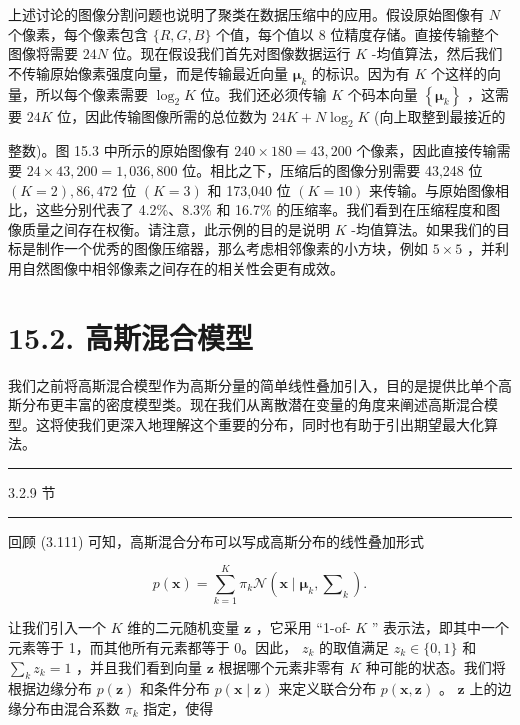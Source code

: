 \documentclass[10pt]{article}
\newcommand{\HRule}{\begin{center}\rule{0.9\linewidth}{0.2mm}\end{center}}
\begin{document}
上述讨论的图像分割问题也说明了聚类在数据压缩中的应用。假设原始图像有 \(N\) 个像素，每个像素包含 \(\{ R,G,B\}\) 个值，每个值以 8 位精度存储。直接传输整个图像将需要 \({24N}\) 位。现在假设我们首先对图像数据运行 \(K\) -均值算法，然后我们不传输原始像素强度向量，而是传输最近向量 \({\mathbf{\mu }}_{k}\) 的标识。因为有 \(K\) 个这样的向量，所以每个像素需要 \({\log }_{2}K\) 位。我们还必须传输 \(K\) 个码本向量 \(\left\{  {\mathbf{\mu }}_{k}\right\}\) ，这需要 \({24K}\) 位，因此传输图像所需的总位数为 \({24K} + N{\log }_{2}K\) (向上取整到最接近的

整数)。图 15.3 中所示的原始图像有 \({240} \times  {180} = {43},{200}\) 个像素，因此直接传输需要 \({24} \times  {43},{200} = 1,{036},{800}\) 位。相比之下，压缩后的图像分别需要 43,248 位 \(\left( {K = 2}\right) ,{86},{472}\) 位 \(\left( {K = 3}\right)\) 和 173,040 位 \(\left( {K = {10}}\right)\) 来传输。与原始图像相比，这些分别代表了 4.2\%、8.3\% 和 16.7\% 的压缩率。我们看到在压缩程度和图像质量之间存在权衡。请注意，此示例的目的是说明 \(K\) -均值算法。如果我们的目标是制作一个优秀的图像压缩器，那么考虑相邻像素的小方块，例如 \(5 \times  5\) ，并利用自然图像中相邻像素之间存在的相关性会更有成效。

\section*{15.2. 高斯混合模型}

我们之前将高斯混合模型作为高斯分量的简单线性叠加引入，目的是提供比单个高斯分布更丰富的密度模型类。现在我们从离散潜在变量的角度来阐述高斯混合模型。这将使我们更深入地理解这个重要的分布，同时也有助于引出期望最大化算法。

\HRule

3.2.9 节

\HRule

回顾 (3.111) 可知，高斯混合分布可以写成高斯分布的线性叠加形式

\[
p\left( \mathbf{x}\right)  = \mathop{\sum }\limits_{{k = 1}}^{K}{\pi }_{k}\mathcal{N}\left( {\mathbf{x} \mid  {\mathbf{\mu }}_{k},{\mathbf{\sum }}_{k}}\right) . \tag{15.6}
\]

让我们引入一个 \(K\) 维的二元随机变量 \(\mathbf{z}\) ，它采用 “1-of- \(K\) ” 表示法，即其中一个元素等于 1，而其他所有元素都等于 0。因此， \({z}_{k}\) 的取值满足 \({z}_{k} \in  \{ 0,1\}\) 和 \(\mathop{\sum }\limits_{k}{z}_{k} = 1\) ，并且我们看到向量 \(\mathbf{z}\) 根据哪个元素非零有 \(K\) 种可能的状态。我们将根据边缘分布 \(p\left( \mathbf{z}\right)\) 和条件分布 \(p\left( {\mathbf{x} \mid  \mathbf{z}}\right)\) 来定义联合分布 \(p\left( {\mathbf{x},\mathbf{z}}\right)\) 。 \(\mathbf{z}\) 上的边缘分布由混合系数 \({\pi }_{k}\) 指定，使得
\end{document}
